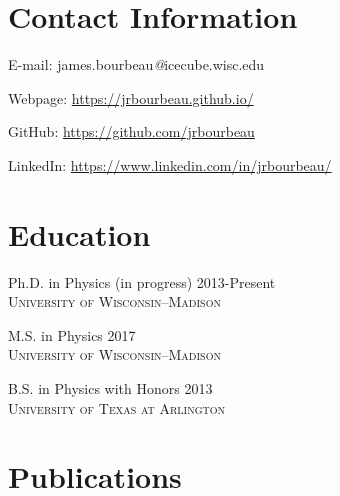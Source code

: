 \documentclass[line,margin]{res}
\begin{document}

\begin{resume}

\section{\sc Contact Information}

E-mail: james.bourbeau{\emph{@}}icecube.wisc.edu

Webpage: \href{https://jrbourbeau.github.io/}{https://jrbourbeau.github.io/}

GitHub: \href{https://github.com/jrbourbeau}{https://github.com/jrbourbeau}

LinkedIn: \href{https://www.linkedin.com/in/jrbourbeau/}{https://www.linkedin.com/in/jrbourbeau/}

\section{\sc Education}
Ph.D. in Physics (in progress) \hfill 2013-Present \\
\textsc{University of Wisconsin--Madison}

M.S. in Physics \hfill 2017 \\
\textsc{University of Wisconsin--Madison}

B.S. in Physics with Honors \hfill 2013 \\
\textsc{University of Texas at Arlington}


\section{\sc Publications}
\begin{itemize}


\end{itemize}
\end{resume}
\end{document}
